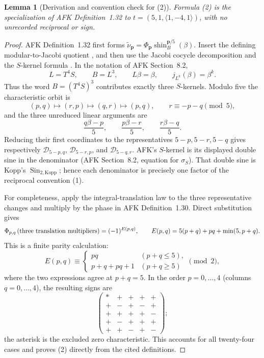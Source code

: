 \documentclass[11pt]{article}
\newtheorem{lemma}[theorem]{Lemma}
\begin{document}
\begin{lemma}[Derivation and convention check for (2)]
Formula \textup{(2)} is the specialization of AFK Definition~1.32 to
$t=(5,1,\langle1,-4,1\rangle)$, with no unrecorded reciprocal or sign.
\end{lemma}

\begin{proof}
AFK Definition~1.32 first forms
$\widetilde\nu_{\boldsymbol p}
=\Phi_{\boldsymbol p}\operatorname{shin}^{\boldsymbol p/5}_{B}(\beta)$.
Insert the defining modular-to-Jacobi quotient
\cite[equation (1.26)]{AFK}, and then use the Jacobi cocycle
decomposition \cite[equations (8.2)--(8.5)]{AFK} and the $S$-kernel
formula \cite[equation (8.6)]{AFK}.  In the notation of AFK Section~8.2,
\[
 L=T^4S,\qquad B=L^3,\qquad L\beta=\beta,\qquad
 j_{L^k}(\beta)=\beta^k .
\]
Thus the word $B=(T^4S)^3$ contributes exactly three $S$-kernels.
Modulo five the characteristic orbit is
\[
 (p,q)\longmapsto(r,p)\longmapsto(q,r)\longmapsto(p,q),
 \qquad r\equiv-p-q\pmod5,
\]
and the three unreduced linear arguments are
\[
 \frac{q\beta-p}{5},\qquad
 \frac{p\beta-r}{5},\qquad
 \frac{r\beta-q}{5}.
\]
Reducing their first coordinates to the representatives
$5-p,5-r,5-q$ gives respectively
$\mathcal D_{5-p,q}$, $\mathcal D_{5-r,p}$, and
$\mathcal D_{5-q,r}$.  AFK's $S$-kernel is its displayed double sine
in the denominator (AFK Section~8.2, equation for
$\sigma_S$).  That double sine is Kopp's
$\operatorname{Sin}_{2,\mathrm{Kopp}}$; hence each denominator is
precisely one factor of the reciprocal convention (1).

For completeness, apply the integral-translation law
\cite[equation (8.9)]{AFK} to the three representative changes and
multiply by the phase in AFK Definition~1.30.  Direct substitution gives
\[
 \Phi_{p,q}\,(\hbox{three translation multipliers})
 =(-1)^{E(p,q)},\qquad
 E(p,q)=5(p+q)+pq+\min(5,p+q).
\]
This is a finite parity calculation:
\[
 E(p,q)\equiv
 \begin{cases}
 pq& (p+q\le5),\\
 p+q+pq+1&(p+q\ge5)
 \end{cases}\pmod2,
\]
where the two expressions agree at $p+q=5$.  In the order
$p=0,\ldots,4$ (columns $q=0,\ldots,4$), the resulting signs are
\[
\begin{pmatrix}
 *&+&+&+&+\\
 +&-&+&-&+\\
 +&+&+&+&-\\
 +&-&+&+&+\\
 +&+&-&+&-
\end{pmatrix};
\]
the asterisk is the excluded zero characteristic.  This accounts for
all twenty-four cases and proves (2) directly from the cited
definitions.
\end{proof}
\end{document}
